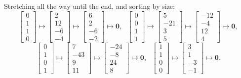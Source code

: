 \documentclass[12pt]{article}
\newcommand{\1}{\mathbf{1}}
\newcommand{\0}{\mathbf{0}}
\theoremstyle{definition}
\begin{document}
Stretching all the way until the end, and sorting by size:
\[
\left[\begin{matrix}0\\1\\1\\0\end{matrix}\right]
\mapsto
\left[\begin{matrix}2\\12\\-6\\-4\end{matrix}\right]
\mapsto
\left[\begin{matrix}6\\2\\-6\\-2\end{matrix}\right]
\mapsto
\0
, \ \ \
\left[\begin{matrix}0\\0\\1\\1\end{matrix}\right]
\mapsto
\left[\begin{matrix}5\\-21\\3\\5\end{matrix}\right]
\mapsto
\left[\begin{matrix}-12\\-4\\12\\4\end{matrix}\right]
\mapsto
\0
,
\]
\[
\left[\begin{matrix}0\\1\\0\\1\end{matrix}\right]
\mapsto
\left[\begin{matrix}7\\-43\\9\\11\end{matrix}\right]
\mapsto
\left[\begin{matrix}-24\\-8\\24\\8\end{matrix}\right]
\mapsto
\0
, \ \ \
\left[\begin{matrix}1\\1\\0\\0\end{matrix}\right]
\mapsto
\left[\begin{matrix}3\\1\\-3\\-1\end{matrix}\right]
\mapsto
\0
.
\]
\end{document}
